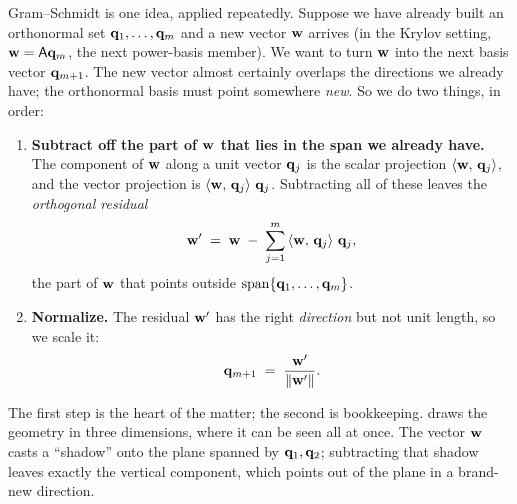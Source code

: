Gram--Schmidt is one idea, applied repeatedly. Suppose we have already built an
orthonormal set $\mathbf{q}_1, \dots, \mathbf{q}_{m}$ and a new vector $\mathbf{w}$ arrives (in the
Krylov setting, $\mathbf{w} = \mathsf{A}\mathbf{q}_m$, the next power-basis member). We want to turn
$\mathbf{w}$ into the next basis vector $\mathbf{q}_{m+1}$. The new vector almost certainly
overlaps the directions we already have; the orthonormal basis must point somewhere
\emph{new}. So we do two things, in order:

\begin{enumerate}
  \item \textbf{Subtract off the part of $\mathbf{w}$ that lies in the span we already
  have.} The component of $\mathbf{w}$ along a unit vector $\mathbf{q}_j$ is the scalar
  projection $\left\langle \mathbf{w},\, \mathbf{q}_j\right\rangle$, and the vector projection is
  $\left\langle \mathbf{w},\, \mathbf{q}_j\right\rangle\,\mathbf{q}_j$. Subtracting all of these leaves the
  \emph{orthogonal residual}
  \[
    \mathbf{w}' \;=\; \mathbf{w} \;-\; \sum_{j=1}^{m} \left\langle \mathbf{w},\, \mathbf{q}_j\right\rangle\,\mathbf{q}_j,
  \]
  the part of $\mathbf{w}$ that points outside $\operatorname{span}\{\mathbf{q}_1,\dots,\mathbf{q}_m\}$.
  \item \textbf{Normalize.} The residual $\mathbf{w}'$ has the right \emph{direction} but
  not unit length, so we scale it:
  \[
    \mathbf{q}_{m+1} \;=\; \frac{\mathbf{w}'}{\lVert\mathbf{w}'\rVert}.
  \]
\end{enumerate}

The first step is the heart of the matter; the second is bookkeeping.
 draws the geometry in three dimensions, where it can be seen
all at once. The vector $\mathbf{w}$ casts a ``shadow'' onto the plane spanned by
$\mathbf{q}_1, \mathbf{q}_2$; subtracting that shadow leaves exactly the vertical component, which
points out of the plane in a brand-new direction.

